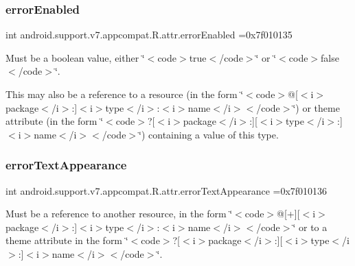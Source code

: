 \subsubsection{\texorpdfstring{error\+Enabled}{errorEnabled}}
{\footnotesize\ttfamily int android.\+support.\+v7.\+appcompat.\+R.\+attr.\+error\+Enabled =0x7f010135\hspace{0.3cm}{\ttfamily [static]}}

Must be a boolean value, either \char`\"{}$<$code$>$true$<$/code$>$\char`\"{} or \char`\"{}$<$code$>$false$<$/code$>$\char`\"{}. 

This may also be a reference to a resource (in the form \char`\"{}$<$code$>$@\mbox{[}$<$i$>$package$<$/i$>$\+:\mbox{]}$<$i$>$type$<$/i$>$\+:$<$i$>$name$<$/i$>$$<$/code$>$\char`\"{}) or theme attribute (in the form \char`\"{}$<$code$>$?\mbox{[}$<$i$>$package$<$/i$>$\+:\mbox{]}\mbox{[}$<$i$>$type$<$/i$>$\+:\mbox{]}$<$i$>$name$<$/i$>$$<$/code$>$\char`\"{}) containing a value of this type. \mbox{\label{classandroid_1_1support_1_1v7_1_1appcompat_1_1R_1_1attr_a3eeafb095dc2fd2d478b56b33313af0b}} 
\subsubsection{\texorpdfstring{error\+Text\+Appearance}{errorTextAppearance}}
{\footnotesize\ttfamily int android.\+support.\+v7.\+appcompat.\+R.\+attr.\+error\+Text\+Appearance =0x7f010136\hspace{0.3cm}{\ttfamily [static]}}

Must be a reference to another resource, in the form \char`\"{}$<$code$>$@\mbox{[}+\mbox{]}\mbox{[}$<$i$>$package$<$/i$>$\+:\mbox{]}$<$i$>$type$<$/i$>$\+:$<$i$>$name$<$/i$>$$<$/code$>$\char`\"{} or to a theme attribute in the form \char`\"{}$<$code$>$?\mbox{[}$<$i$>$package$<$/i$>$\+:\mbox{]}\mbox{[}$<$i$>$type$<$/i$>$\+:\mbox{]}$<$i$>$name$<$/i$>$$<$/code$>$\char`\"{}. \mbox{\label{classandroid_1_1support_1_1v7_1_1appcompat_1_1R_1_1attr_a804ae4660db47a214095c80b7b7a5735}} 
